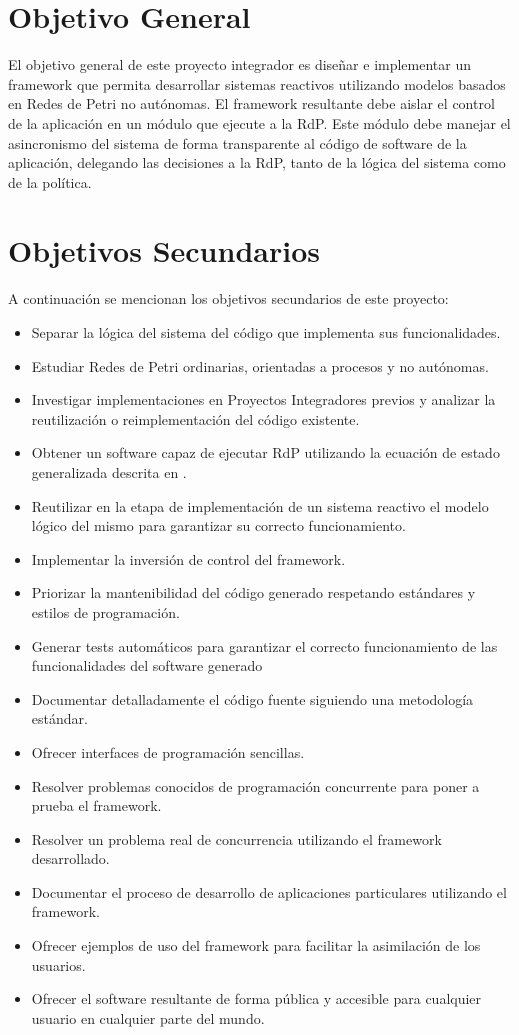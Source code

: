 \section{Objetivo General}
El objetivo general de este proyecto integrador es diseñar e implementar un
framework que permita desarrollar sistemas reactivos utilizando modelos basados
en Redes de Petri no autónomas. El framework resultante debe aislar el control
de la aplicación en un módulo que ejecute a la RdP. Este módulo debe manejar el
asincronismo del sistema de forma transparente al código de software de la
aplicación, delegando las decisiones a la RdP, tanto de la lógica del sistema
como de la política.


\section{Objetivos Secundarios}
\label{sec:objetivos_secundarios}
A continuación se mencionan los objetivos secundarios de este proyecto:
\begin{itemize}
  \item Separar la lógica del sistema del código que implementa sus
  funcionalidades.
  \item Estudiar Redes de Petri ordinarias, orientadas a procesos y no
  autónomas.
  \item Investigar implementaciones en Proyectos Integradores previos y analizar
  la reutilización o reimplementación del código existente.
  \item Obtener un software capaz de ejecutar RdP utilizando la ecuación de
  estado generalizada descrita en \cite{Ecuacion_generalizada_LAC}.
  \item Reutilizar en la etapa de implementación de un sistema reactivo el
  modelo lógico del mismo para garantizar su correcto funcionamiento.
  \item Implementar la inversión de control del framework.
  \item Priorizar la mantenibilidad del código generado respetando estándares y
  estilos de programación.
  \item Generar tests automáticos para garantizar el correcto funcionamiento de
  las funcionalidades del software generado
  \item Documentar detalladamente el código fuente siguiendo una metodología
  estándar.
  \item Ofrecer interfaces de programación sencillas.
  \item Resolver problemas conocidos de programación concurrente para poner a
  prueba el framework.
  \item Resolver un problema real de concurrencia utilizando el framework
  desarrollado.
  \item Documentar el proceso de desarrollo de aplicaciones particulares
  utilizando el framework.
  \item Ofrecer ejemplos de uso del framework para facilitar la asimilación de
  los usuarios.
  \item Ofrecer el software resultante de forma pública y accesible para
  cualquier usuario en cualquier parte del mundo.
\end{itemize}


